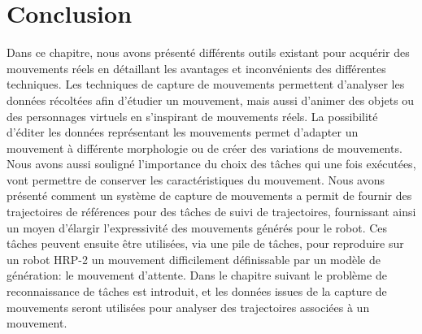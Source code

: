 \section*{Conclusion}

Dans ce chapitre, nous avons présenté différents outils existant pour
acquérir des mouvements réels en détaillant les avantages et inconvénients des différentes 
techniques. Les techniques de capture de mouvements permettent
d'analyser les données récoltées afin d'étudier un mouvement, mais aussi
d'animer des objets ou des personnages virtuels en s'inspirant 
de mouvements réels. La possibilité d'éditer 
les données représentant les mouvements permet d'adapter un mouvement
à différente morphologie ou de créer des variations de mouvements.
Nous avons aussi souligné l'importance
du choix des t\^aches qui une fois exécutées, vont permettre de conserver les
caractéristiques du mouvement.
Nous avons présenté comment un système de capture de mouvements a permit
de fournir des trajectoires de références pour des t\^aches de suivi de trajectoires,
fournissant ainsi un moyen d'élargir l'expressivité des mouvements générés pour le robot.
Ces t\^aches peuvent ensuite être utilisées, via une pile de t\^aches, pour reproduire sur un robot HRP-2
un mouvement difficilement définissable par un modèle de génération: le mouvement
d'attente. Dans le chapitre suivant le problème de reconnaissance de t\^aches
est introduit, et les données issues de la capture de mouvements seront utilisées 
pour analyser des trajectoires associées à un mouvement.

